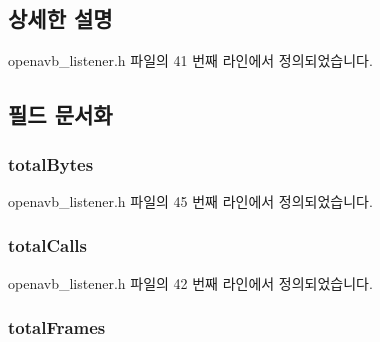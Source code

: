 \subsection{상세한 설명}


openavb\+\_\+listener.\+h 파일의 41 번째 라인에서 정의되었습니다.



\subsection{필드 문서화}
\subsubsection[{\texorpdfstring{total\+Bytes}{totalBytes}}]{ total\+Bytes}\hypertarget{structlistener__stats__t_a0c6a9cfc47f701f45a826b03f96f8169}{}\label{structlistener__stats__t_a0c6a9cfc47f701f45a826b03f96f8169}


openavb\+\_\+listener.\+h 파일의 45 번째 라인에서 정의되었습니다.

\subsubsection[{\texorpdfstring{total\+Calls}{totalCalls}}]{ total\+Calls}\hypertarget{structlistener__stats__t_a9e027d04ac91998fac3dbdfe70e93c8f}{}\label{structlistener__stats__t_a9e027d04ac91998fac3dbdfe70e93c8f}


openavb\+\_\+listener.\+h 파일의 42 번째 라인에서 정의되었습니다.

\subsubsection[{\texorpdfstring{total\+Frames}{totalFrames}}]{ total\+Frames}\hypertarget{structlistener__stats__t_a91aa71fc6996d4038afd5252772b8c16}{}\label{structlistener__stats__t_a91aa71fc6996d4038afd5252772b8c16}


